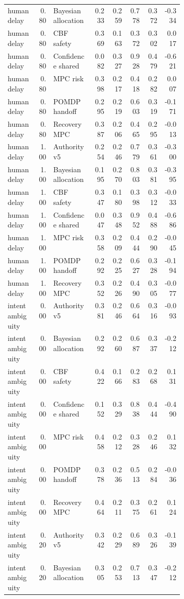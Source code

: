 \documentclass{article}
\begin{document}
\begin{center}
\begin{longtable}{p{0.17\linewidth}rp{0.23\linewidth}rrrrr}
human delay & 0.80 & Bayesian allocation & 0.233 & 0.259 & 0.778 & 0.372 & -0.334\\
human delay & 0.80 & CBF safety & 0.369 & 0.163 & 0.372 & 0.302 & 0.017\\
human delay & 0.80 & Confidence shared & 0.082 & 0.327 & 0.928 & 0.479 & -0.621\\
human delay & 0.80 & MPC risk & 0.398 & 0.217 & 0.418 & 0.282 & 0.007\\
human delay & 0.80 & POMDP handoff & 0.295 & 0.219 & 0.603 & 0.319 & -0.171\\
human delay & 0.80 & Recovery MPC & 0.387 & 0.206 & 0.465 & 0.295 & -0.013\\
human delay & 1.00 & Authority v5 & 0.254 & 0.246 & 0.779 & 0.361 & -0.300\\
human delay & 1.00 & Bayesian allocation & 0.195 & 0.270 & 0.803 & 0.381 & -0.395\\
human delay & 1.00 & CBF safety & 0.347 & 0.180 & 0.398 & 0.312 & -0.033\\
human delay & 1.00 & Confidence shared & 0.047 & 0.348 & 0.952 & 0.488 & -0.686\\
human delay & 1.00 & MPC risk & 0.358 & 0.209 & 0.444 & 0.290 & -0.045\\
human delay & 1.00 & POMDP handoff & 0.292 & 0.225 & 0.627 & 0.328 & -0.194\\
human delay & 1.00 & Recovery MPC & 0.352 & 0.226 & 0.490 & 0.305 & -0.077\\
intent ambiguity & 0.00 & Authority v5 & 0.381 & 0.246 & 0.664 & 0.316 & -0.093\\
intent ambiguity & 0.00 & Bayesian allocation & 0.292 & 0.260 & 0.687 & 0.337 & -0.212\\
intent ambiguity & 0.00 & CBF safety & 0.422 & 0.166 & 0.283 & 0.268 & 0.131\\
intent ambiguity & 0.00 & Confidence shared & 0.152 & 0.329 & 0.838 & 0.444 & -0.490\\
intent ambiguity & 0.00 & MPC risk & 0.458 & 0.212 & 0.328 & 0.246 & 0.132\\
intent ambiguity & 0.00 & POMDP handoff & 0.378 & 0.236 & 0.513 & 0.284 & -0.036\\
intent ambiguity & 0.00 & Recovery MPC & 0.464 & 0.211 & 0.375 & 0.261 & 0.124\\
intent ambiguity & 0.20 & Authority v5 & 0.342 & 0.229 & 0.689 & 0.326 & -0.139\\
intent ambiguity & 0.20 & Bayesian allocation & 0.305 & 0.253 & 0.713 & 0.347 & -0.212\\

\end{longtable}
\end{center}
\end{document}
